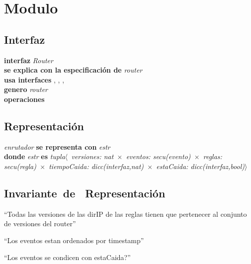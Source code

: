 \section*{Modulo }

\vspace{22pt}

\subsection*{Interfaz}
\textbf{interfaz} \textit{Router}\\
\textbf{se explica con la especificaci\'on de} \textit{router}\\
\textbf{usa interfaces} , , 		, \\
\textbf{genero} \textit{router}\\
\textbf{operaciones}


\subsection*{Representaci\'on}
\textit{enrutador} \textbf{se representa con} \textit{estr}\\
\textbf{donde} \textit{estr} \textbf{es} \textit{tupla$\langle$\ versiones: nat\ 	$\times$\ eventos: secu(evento)\ $\times$\ reglas: secu(regla)\ $\times$\ tiempoCaida: dicc(interfaz,nat)\ $\times$\ estaCaida: dicc(interfaz,bool)$\rangle$}


\subsection*{Invariante\ de \ Representaci\'on}
\vspace{11pt}

\vspace{33pt}
\otrasops

``Todas las versiones de las dirIP de las reglas tienen que pertenecer al conjunto de versiones del router''

``Los eventos estan ordenados por timestamp''

``Los eventos se condicen con estaCaida?''

